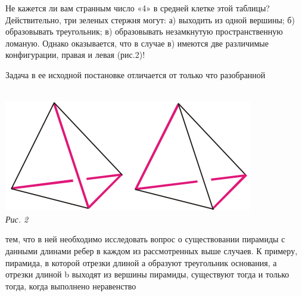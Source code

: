 \documentclass{article}
\begin{document}
\begin{multicols}{3}
Не кажется ли вам странным число «4» в средней клетке этой таблицы?
Действительно, три зеленых стержня могут: а) выходить из одной вершины;
б) образовывать треугольник; в) образовывать незамкнутую
пространственную ломаную. Однако оказывается, что в случае
в) имеются две различимые конфигурации, правая и левая (рис.2)! \par
Задача в ее исходной постановке отличается от только что разобранной \\ \\
\begin{minipage}{\linewidth}
\includegraphics[width=\linewidth]{images/picture2.png} \\
\textsl{Рис. 2} \\
\end{minipage}
тем, что в ней необходимо исследовать вопрос о существовании
пирамиды с данными длинами ребер в каждом из рассмотренных
выше случаев. К примеру, пирамида, в которой отрезки длиной
$а$ образуют треугольник основания, а отрезки длиной b выходят из
вершины пирамиды, существуют тогда и только тогда, когда
выполнено неравенство\\ 


\end{multicols}
\end{document}
